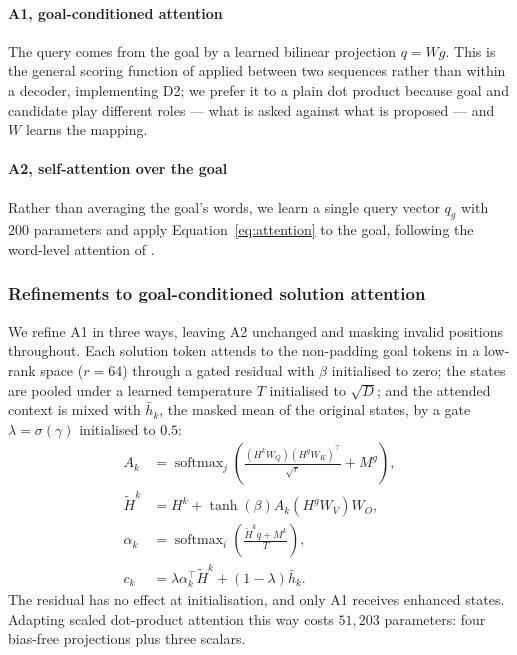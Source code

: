 \documentclass[11pt]{article}
\begin{document}
\paragraph{A1, goal-conditioned attention}
The query comes from the goal by a learned bilinear projection $q=Wg$. This
is the general scoring function of \citet{luong2015attention} applied between
two sequences rather than within a decoder, implementing D2; we prefer it to
a plain dot product because goal and candidate play different roles --- what
is asked against what is proposed --- and $W$ learns the mapping.

\paragraph{A2, self-attention over the goal}
Rather than averaging the goal's words, we learn a single query vector $q_g$
with $200$ parameters and apply Equation~\ref{eq:attention} to the goal,
following the word-level attention of \citet{yang2016hierarchical}.

\subsubsection{Refinements to goal-conditioned solution attention}

We refine A1 in three ways, leaving A2 unchanged and masking invalid
positions throughout. Each solution token attends to the non-padding goal
tokens in a low-rank space ($r=64$) through a gated residual with $\beta$
initialised to zero; the states are pooled under a learned temperature $T$
initialised to $\sqrt{D}$; and the attended context is mixed with $\bar h_k$,
the masked mean of the original states, by a gate $\lambda=\sigma(\gamma)$
initialised to $0.5$:
\begin{align}
A_k &= \operatorname{softmax}_j\!\left(
  \frac{(H^kW_Q)(H^gW_K)^\top}{\sqrt r}+M^g\right),\nonumber\\
\widetilde H^k &= H^k+\tanh(\beta)A_k(H^gW_V)W_O,\nonumber\\
\alpha_k &= \operatorname{softmax}_i\!\left(
  \frac{\widetilde H^kq+M^k}{T}\right),\nonumber\\
c_k &= \lambda\alpha_k^\top\widetilde H^k+(1-\lambda)\bar h_k.
\label{eq:refinements}
\end{align}
The residual has no effect at initialisation, and only A1 receives enhanced
states. Adapting scaled dot-product attention \citep{vaswani2017attention}
this way costs $51{,}203$ parameters: four bias-free projections plus three
scalars.
\end{document}
